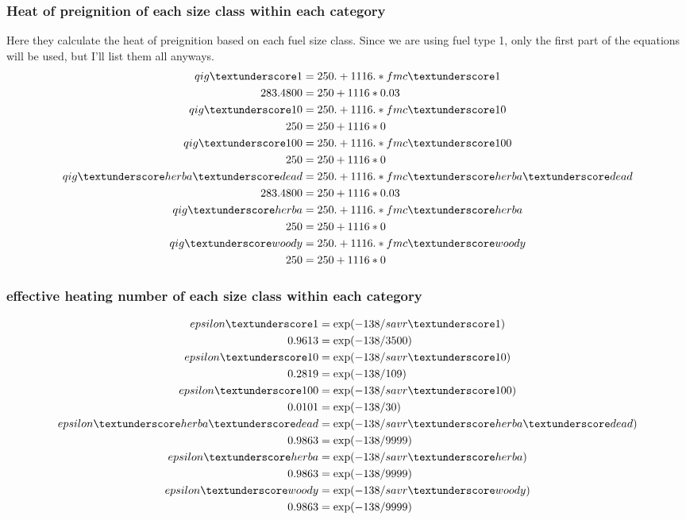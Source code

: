 \documentclass{article}
\newcommand\und{\textunderscore}
\begin{document}
\subsubsection*{Heat of preignition of each size class within each category}
Here they calculate the heat of preignition based on each fuel size class. Since we are using fuel type 1, only the first part of the equations will be used, but I'll list them all anyways. 
\begin{equation}
\label{qig_WFA}
	\begin{split}
	qig\und 1         &= 250. + 1116.*fmc\und 1 \\
	283.4800 &= 250 + 1116 * 0.03 \\
qig\und 10        &= 250. + 1116.*fmc\und 10 \\
250 &= 250 + 1116 * 0 \\
qig\und 100       &= 250. + 1116.*fmc\und 100 \\
250 &= 250 + 1116 * 0 \\
qig\und herba\und dead &= 250. + 1116.*fmc\und herba\und dead \\
283.4800 &= 250 + 1116 * 0.03 \\
qig\und herba     &= 250. + 1116.*fmc\und herba \\
250 &= 250 + 1116 * 0 \\
qig\und woody     &= 250. + 1116.*fmc\und woody \\
250 &= 250 + 1116 * 0 
\end{split}
\end{equation}

\subsubsection*{effective heating number of each size class within each category}
\begin{equation}
	\begin{split}
	epsilon\und 1          &= \exp(-138 / savr\und 1) \\
		0.9613 &= \exp (-138 / 3500) \\
	epsilon\und 10         &= \exp(-138 / savr\und 10) \\
		0.2819 &= \exp (-138 / 109) \\
	epsilon\und 100        &= \exp(-138 / savr\und 100) \\
		0.0101 &= \exp (-138 / 30) \\
	epsilon\und herba\und dead &= \exp(-138 / savr\und herba\und dead) \\
		0.9863 &= \exp (-138 / 9999) \\
	epsilon\und herba      &= \exp(-138 / savr\und herba) \\
		0.9863 &= \exp (-138 / 9999) \\
	epsilon\und woody      &= \exp(-138 / savr\und woody) \\
		0.9863 &= \exp (-138 / 9999) 
	\end{split}
\end{equation}
\end{document}
